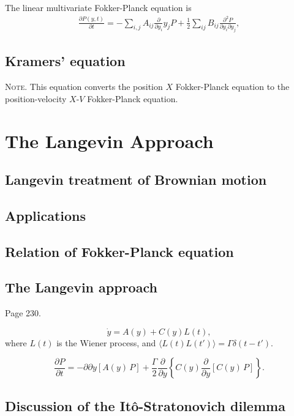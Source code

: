 \documentclass{book}
\numberwithin{equation}{section}
\theoremstyle{plain}
\theoremstyle{definition}
\theoremstyle{remark}
\theoremstyle{BoldStyle}
\numberwithin{exercise}{section}
\newcommand{\note}[1]{{\color{DarkGreen}\footnotesize \textsc{Note.} #1}}
\begin{document}
The linear multivariate Fokker-Planck equation is
\begin{align}
\frac{  \partial P(y, t) } { \partial t }
=
-\sum_{i,j} A_{ij} \frac{ \partial } { \partial y_i } y_j P
+ \frac 1 2 \sum_{ij} B_{ij} \frac{ \partial^2 P } { \partial y_i \partial y_j },
\tag{6.4}
\end{align}

\section{Kramers' equation}

\note{This equation converts the position $X$ Fokker-Planck equation
  to the position-velocity $X$-$V$ Fokker-Planck equation.
}

\chapter{The Langevin Approach}

\section{Langevin treatment of Brownian motion}

\section{Applications}

\section{Relation of Fokker-Planck equation}

\section{The Langevin approach}

Page 230.

$$
\dot y = A(y) + C(y) L(t),
$$
where $L(t)$ is the Wiener process,
and $\langle L(t) L(t') \rangle = \Gamma \delta(t - t')$.


$$
\frac{ \partial P }{ \partial t }
=
-{ \partial } { \partial y } [ A(y) \, P ]
+
\frac{ \Gamma } { 2 } \frac{ \partial } { \partial y }
\left\{
  C(y)
  \frac{ \partial } { \partial y } [ C(y) \, P ]
\right\}.
$$

\section{Discussion of the It\^o-Stratonovich dilemma}
\end{document}
